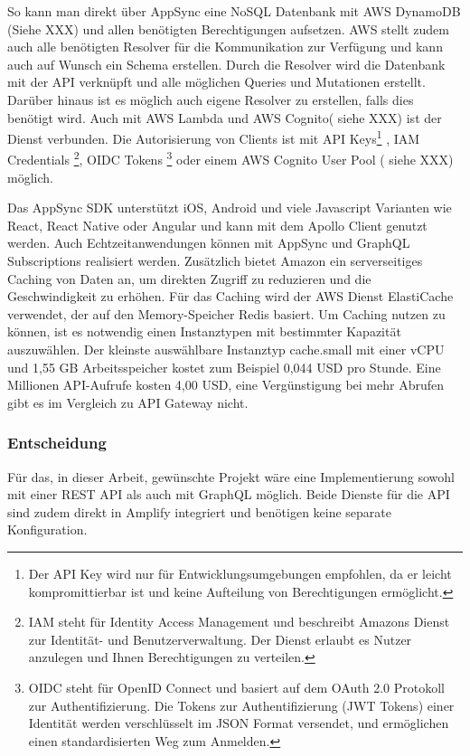 So kann man direkt über AppSync eine NoSQL Datenbank mit AWS DynamoDB (Siehe XXX) und allen benötigten Berechtigungen aufsetzen.
AWS stellt zudem auch alle benötigten Resolver für die Kommunikation zur Verfügung und kann auch auf Wunsch ein Schema erstellen. Durch die Resolver wird die Datenbank mit
der API verknüpft und alle möglichen Queries und Mutationen erstellt. Darüber hinaus ist es möglich auch eigene Resolver zu erstellen, falls dies benötigt wird.
Auch mit AWS Lambda und AWS Cognito( siehe XXX) ist der Dienst verbunden.
Die Autorisierung von Clients ist mit API Keys\footnote{Der API Key wird nur für Entwicklungsumgebungen empfohlen,
da er leicht kompromittierbar ist und keine Aufteilung von Berechtigungen ermöglicht.}
, IAM Credentials \footnote{
    IAM steht für Identity Access Management und beschreibt Amazons Dienst zur Identität- und Benutzerverwaltung. Der Dienst erlaubt es Nutzer anzulegen und
    Ihnen Berechtigungen zu verteilen.}, OIDC Tokens \footnote{OIDC steht für OpenID Connect und basiert auf dem OAuth 2.0 Protokoll zur Authentifizierung.
    Die Tokens zur Authentifizierung (JWT Tokens) einer Identität werden verschlüsselt im JSON Format versendet, und ermöglichen einen standardisierten Weg zum Anmelden.
          } oder einem AWS
Cognito User Pool ( siehe XXX) möglich. \cite[]{AppSyncAuth}

Das AppSync SDK unterstützt iOS, Android und viele Javascript Varianten wie React, React Native oder Angular und kann mit dem Apollo Client genutzt werden.
Auch Echtzeitanwendungen können mit AppSync und GraphQL Subscriptions realisiert werden.
Zusätzlich bietet Amazon ein serverseitiges Caching von Daten an, um direkten Zugriff zu reduzieren und die Geschwindigkeit zu erhöhen. Für das Caching wird
der AWS Dienst ElastiCache verwendet, der auf den Memory-Speicher Redis basiert.
Um Caching nutzen zu können, ist es notwendig einen Instanztypen mit bestimmter Kapazität auszuwählen. Der kleinste auswählbare Instanztyp \glqq cache.small\grqq{}
mit einer vCPU und 1,55 GB Arbeitsspeicher kostet zum Beispiel 0,044 USD pro Stunde.
Eine Millionen API-Aufrufe kosten 4,00 USD, eine Vergünstigung bei mehr Abrufen gibt es im Vergleich zu API Gateway nicht.
\cite[]{AppSync} \cite[]{AppSyncPreise}



\subsubsection{Entscheidung}
Für das, in dieser Arbeit, gewünschte Projekt wäre eine Implementierung sowohl mit einer REST API als auch mit GraphQL möglich.
Beide Dienste für die API sind zudem direkt in Amplify integriert und benötigen keine separate Konfiguration.

